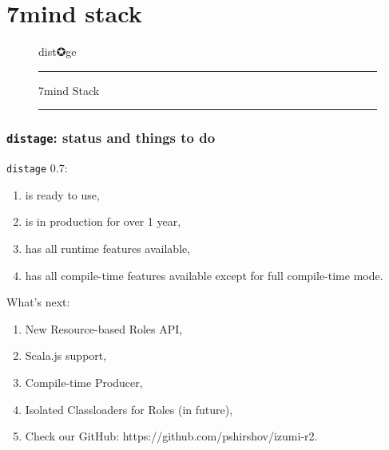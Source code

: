 \documentclass[usenames,dvipsnames]{beamer}
\newcommand{\distage}{\texttt{distage}\xspace}
\begin{document}
\section{7mind stack}
\begin{frame}
  \begin{figure}
  \Huge
  \color{RubineRed} dist✪ge
  \noindent
  \rule{\linewidth}{1mm}
  \Large 7mind Stack
  \rule{\linewidth}{1mm}
  \end{figure}
\end{frame}

\begin{frame}[fragile]
  \frametitle{\distage: status and things to do}
  \distage{} 0.7:
  \begin{enumerate}
    \item is ready to use,
    \item is in production for over 1 year,
    \item has all runtime features available,
    \item has all compile-time features available except for full compile-time mode.
  \end{enumerate}
  \vspace{0.3cm}
  What's next:
  \begin{enumerate}
    \item New Resource-based Roles API,
    \item Scala.js support,
    \item Compile-time Producer,
    \item Isolated Classloaders for Roles (in future),
    \item Check our GitHub: https://github.com/pshirshov/izumi-r2.
  \end{enumerate}
\end{frame}
\end{document}
